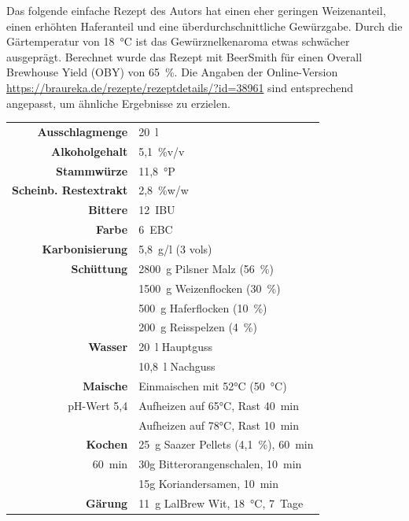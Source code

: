 \documentclass[a4paper,parskip=half]{scrartcl}
\begin{document}
Das folgende einfache Rezept des Autors hat einen eher geringen Weizenanteil,
einen erhöhten Haferanteil und eine überdurchschnittliche Gewürzgabe.
Durch die Gärtemperatur von 18~°C ist das Gewürznelkenaroma etwas schwächer
ausgeprägt. Berechnet wurde das Rezept mit BeerSmith für einen Overall
Brewhouse Yield (OBY) von 65~\%. Die Angaben der Online-Version \url{https://braureka.de/rezepte/rezeptdetails/?id=38961} sind entsprechend
angepasst, um ähnliche Ergebnisse zu erzielen.

\begin{table}[H]
\centering
\begin{tabular}{rl}
\toprule
\textbf{Ausschlagmenge} & 20~l \\
\textbf{Alkoholgehalt} & 5,1~\%v/v \\
\textbf{Stammwürze} & 11,8~°P \\
\textbf{Scheinb. Restextrakt} & 2,8~\%w/w \\
\textbf{Bittere} & 12~IBU \\
\textbf{Farbe} & 6~EBC \\
\textbf{Karbonisierung} & 5,8~g/l (3 vols) \\
\midrule
\textbf{Schüttung} & 2800~g Pilsner Malz (56~\%) \\
 & 1500~g Weizenflocken (30~\%) \\
 & 500~g Haferflocken (10~\%) \\ 
 & 200~g Reisspelzen (4~\%) \\
\midrule
\textbf{Wasser} & 20~l Hauptguss \\
 & 10,8~l Nachguss \\
\midrule
\textbf{Maische} & Einmaischen mit 52°C (50~°C) \\
pH-Wert 5,4 & Aufheizen auf 65°C, Rast 40~min \\
 & Aufheizen auf 78°C, Rast 10~min \\
\midrule
\textbf{Kochen} & 25~g Saazer Pellets (4,1~\%), 60~min \\
60~min & 30g Bitterorangenschalen, 10~min \\
 & 15g Koriandersamen, 10~min \\
\midrule
\textbf{Gärung} & 11~g LalBrew Wit, 18~°C, 7~Tage \\
\bottomrule
\end{tabular}
\end{table}

\printbibliography[title=Quellen]
\end{document}
